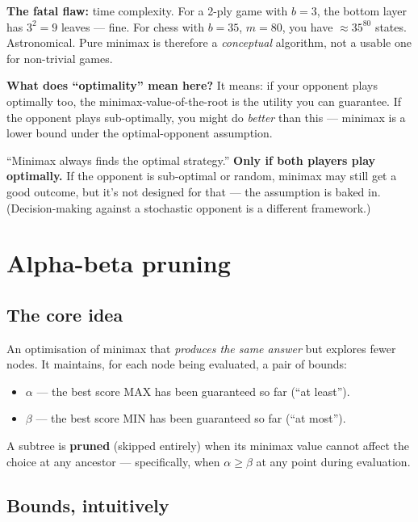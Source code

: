 \documentclass[11pt, a4paper]{article}
\begin{document}
\textbf{The fatal flaw:} time complexity. For a 2-ply game with $b = 3$, the bottom layer has $3^2 = 9$ leaves — fine. For chess with $b = 35$, $m = 80$, you have $\approx 35^{80}$ states. Astronomical. Pure minimax is therefore a \emph{conceptual} algorithm, not a usable one for non-trivial games.

\textbf{What does ``optimality'' mean here?} It means: if your opponent plays optimally too, the minimax-value-of-the-root is the utility you can guarantee. If the opponent plays sub-optimally, you might do \emph{better} than this — minimax is a lower bound under the optimal-opponent assumption.

\begin{trapbox}
``Minimax always finds the optimal strategy.'' \textbf{Only if both players play optimally.} If the opponent is sub-optimal or random, minimax may still get a good outcome, but it's not designed for that — the assumption is baked in. (Decision-making against a stochastic opponent is a different framework.)
\end{trapbox}

\section{Alpha-beta pruning}

\subsection{The core idea}

\begin{defbox}
An optimisation of minimax that \emph{produces the same answer} but explores fewer nodes. It maintains, for each node being evaluated, a pair of bounds:
\begin{itemize}[itemsep=0pt, topsep=0pt]
  \item $\alpha$ — the best score MAX has been guaranteed so far (``at least'').
  \item $\beta$ — the best score MIN has been guaranteed so far (``at most'').
\end{itemize}
A subtree is \textbf{pruned} (skipped entirely) when its minimax value cannot affect the choice at any ancestor — specifically, when $\alpha \ge \beta$ at any point during evaluation.
\end{defbox}

\subsection{Bounds, intuitively}
\end{document}

